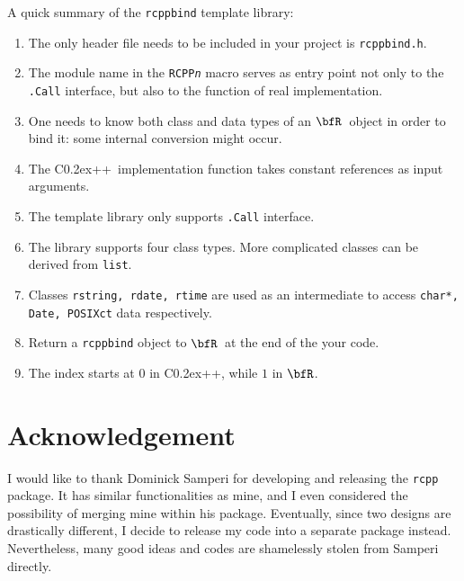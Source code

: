 \documentclass{article}
\def\C++{C{\raise 0.2ex\hbox{++}}}
\newcommand{\R}{$\bfR$}
\begin{document}
A quick summary of the \texttt{rcppbind} template library:
\begin{enumerate}
  \item The only header file needs to be included in your
    project is \texttt{rcppbind.h}.
  \item The module name in the \texttt{RCPP\textsl{n}} macro
    serves as entry point not only to the \texttt{.Call}
    interface, but also to the function of real
    implementation.
  \item One needs to know both class and data types of an \R\
    object in order to bind it: some internal conversion
    might occur.
  \item The \C++\ implementation function takes constant
    references as input arguments.
  \item The template library only supports \texttt{.Call}
    interface.
  \item The library supports four class types. More
    complicated classes can be derived from \texttt{list}.
  \item Classes \texttt{rstring, rdate, rtime} are used as an
    intermediate to access \texttt{char*, Date, POSIXct} data
    respectively.
  \item Return a \texttt{rcppbind} object to \R\ at the end
    of the your code.
  \item The index starts at $0$ in \C++, while $1$ in \R.
\end{enumerate}

\section{Acknowledgement}

I would like to thank Dominick Samperi for developing and
releasing the \texttt{rcpp} package. It has similar
functionalities as mine, and I even considered the
possibility of merging mine within his package.  Eventually,
since two designs are drastically different, I decide to
release my code into a separate package instead.
Nevertheless, many good ideas and codes are shamelessly
stolen from Samperi directly.
\end{document}
